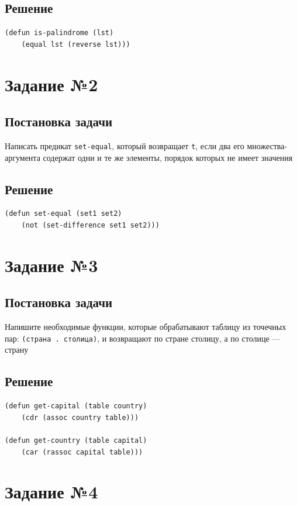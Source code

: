 \documentclass[12pt]{report}
\begin{document}
\subsection*{Решение}
\begin{lstlisting}
(defun is-palindrome (lst)
	(equal lst (reverse lst)))
\end{lstlisting}

\section*{Задание №2}
\subsection*{Постановка задачи}
Написать предикат \texttt{set-equal}, который возвращает \texttt{t}, если два его множества-аргумента содержат одни и те же элементы, порядок которых не имеет значения

\subsection*{Решение}
\begin{lstlisting}
(defun set-equal (set1 set2)
	(not (set-difference set1 set2)))
\end{lstlisting}


\section*{Задание №3}
\subsection*{Постановка задачи}
Напишите необходимые функции, которые обрабатывают таблицу из точечных пар: \texttt{(страна . столица)}, и возвращают по стране столицу, а по столице --- страну

\subsection*{Решение}
\begin{lstlisting}
(defun get-capital (table country)
	(cdr (assoc country table)))

(defun get-country (table capital)
	(car (rassoc capital table)))
\end{lstlisting}


\section*{Задание №4}
\end{document}
